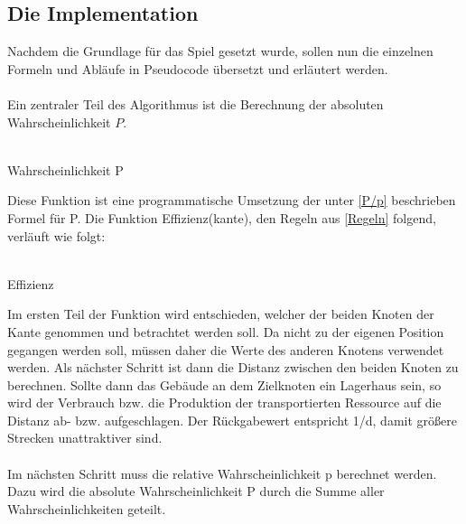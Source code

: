\documentclass[12pt]{article}
\begin{document}
\subsection{Die Implementation}\label{pseudo}
Nachdem die Grundlage für das Spiel gesetzt wurde, sollen nun die einzelnen Formeln und Abläufe in Pseudocode übersetzt und erläutert werden. \\\\
Ein zentraler Teil des Algorithmus ist die Berechnung der absoluten Wahrscheinlichkeit $P$. \\\\
\begin{algorithm}[H]
 \caption{Wahrscheinlichkeit P}
 \DontPrintSemicolon

\end{algorithm}Diese Funktion ist eine programmatische Umsetzung der unter \ref{P/p} beschrieben Formel für P.
Die Funktion Effizienz(kante), den Regeln aus \ref{Regeln}  folgend, verläuft wie folgt:\\\\
\begin{algorithm}[H]
\caption{Effizienz}
\DontPrintSemicolon
{}
\end{algorithm}Im ersten Teil der Funktion wird entschieden, welcher der beiden Knoten der Kante genommen und betrachtet werden soll. Da nicht zu der eigenen Position gegangen werden soll, müssen daher die Werte des anderen Knotens verwendet werden. Als nächster Schritt ist dann die Distanz zwischen den beiden Knoten zu berechnen. Sollte dann das Gebäude an dem Zielknoten ein Lagerhaus sein, so wird der Verbrauch bzw. die Produktion der transportierten Ressource auf die Distanz ab- bzw. aufgeschlagen. 
Der Rückgabewert entspricht 1/d, damit größere Strecken unattraktiver sind.\\\\
Im nächsten Schritt muss die relative Wahrscheinlichkeit p berechnet werden. Dazu wird die absolute Wahrscheinlichkeit P durch die Summe aller Wahrscheinlichkeiten geteilt.\\\\
\end{document}
